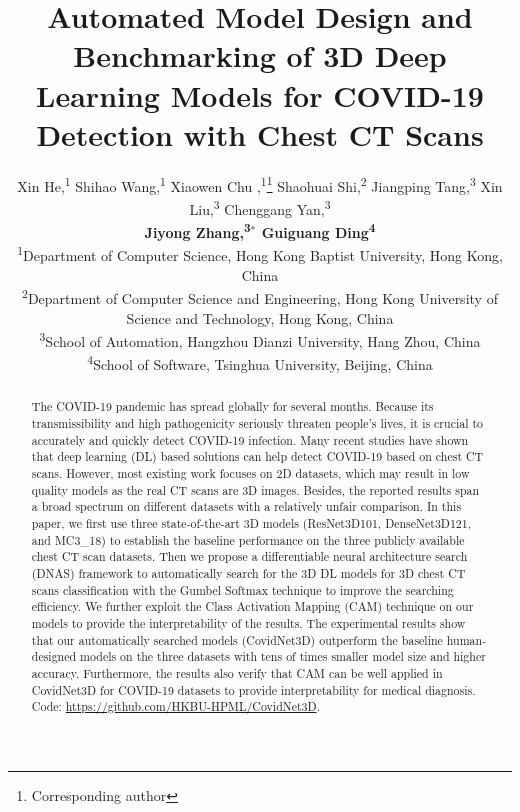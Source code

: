 \documentclass[letterpaper]{article}
\begin{document}
\title{Automated Model Design and Benchmarking of 3D Deep Learning Models for COVID-19 Detection with Chest CT Scans}


\author{Xin He,\textsuperscript{1}
Shihao Wang,\textsuperscript{1}
Xiaowen Chu ,\textsuperscript{1}\thanks{Corresponding author}
Shaohuai Shi,\textsuperscript{2}
Jiangping Tang,\textsuperscript{3}
Xin Liu,\textsuperscript{3}
Chenggang Yan,\textsuperscript{3}\\
{\bf \Large Jiyong Zhang,\textsuperscript{3}$^*$
Guiguang Ding\textsuperscript{4}}\\
\textsuperscript{1}{Department of Computer Science, Hong Kong Baptist University, Hong Kong, China}\\
\textsuperscript{2}{Department of Computer Science and Engineering, Hong Kong University of Science and Technology, Hong Kong, China}\\
\textsuperscript{3}{School of Automation, Hangzhou Dianzi University, Hang Zhou, China}\\
\textsuperscript{4}{School of Software, Tsinghua University, Beijing, China}\\
}


\maketitle
\begin{abstract}

The COVID-19 pandemic has spread globally for several months. Because its transmissibility and high pathogenicity seriously threaten people's lives, it is crucial to accurately and quickly detect COVID-19 infection. Many recent studies have shown that deep learning (DL) based solutions can help detect COVID-19 based on chest CT scans. However, most existing work focuses on 2D datasets, which may result in low quality models as the real CT scans are 3D images. Besides, the reported results span a broad spectrum on different datasets with a relatively unfair comparison. In this paper, we first use three state-of-the-art 3D models (ResNet3D101, DenseNet3D121, and MC3\_18) to establish the baseline performance on the three publicly available chest CT scan datasets. Then we propose a differentiable neural architecture search (DNAS) framework to automatically search for the 3D DL models for 3D chest CT scans classification with the Gumbel Softmax technique to improve the searching efficiency. We further exploit the Class Activation Mapping (CAM) technique on our models to provide the interpretability of the results. The experimental results show that our automatically searched models (CovidNet3D) outperform the baseline human-designed models on the three datasets with tens of times smaller model size and higher accuracy. Furthermore, the results also verify that CAM can be well applied in CovidNet3D for COVID-19 datasets to provide interpretability for medical diagnosis. Code: \url{https://github.com/HKBU-HPML/CovidNet3D}.

\end{abstract}
\end{document}
